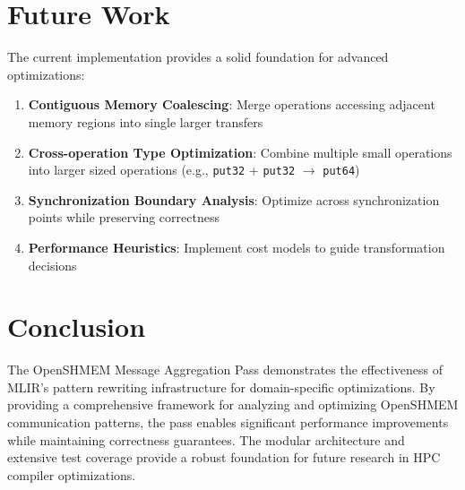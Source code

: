 \documentclass{article}
\begin{document}
\section{Future Work}

The current implementation provides a solid foundation for advanced optimizations:

\begin{enumerate}
\item \textbf{Contiguous Memory Coalescing}: Merge operations accessing adjacent memory regions into single larger transfers
\item \textbf{Cross-operation Type Optimization}: Combine multiple small operations into larger sized operations (e.g., \texttt{put32} + \texttt{put32} $\rightarrow$ \texttt{put64})
\item \textbf{Synchronization Boundary Analysis}: Optimize across synchronization points while preserving correctness
\item \textbf{Performance Heuristics}: Implement cost models to guide transformation decisions
\end{enumerate}

\section{Conclusion}

The OpenSHMEM Message Aggregation Pass demonstrates the effectiveness of MLIR's pattern rewriting infrastructure for domain-specific optimizations. By providing a comprehensive framework for analyzing and optimizing OpenSHMEM communication patterns, the pass enables significant performance improvements while maintaining correctness guarantees. The modular architecture and extensive test coverage provide a robust foundation for future research in HPC compiler optimizations.
\end{document}
